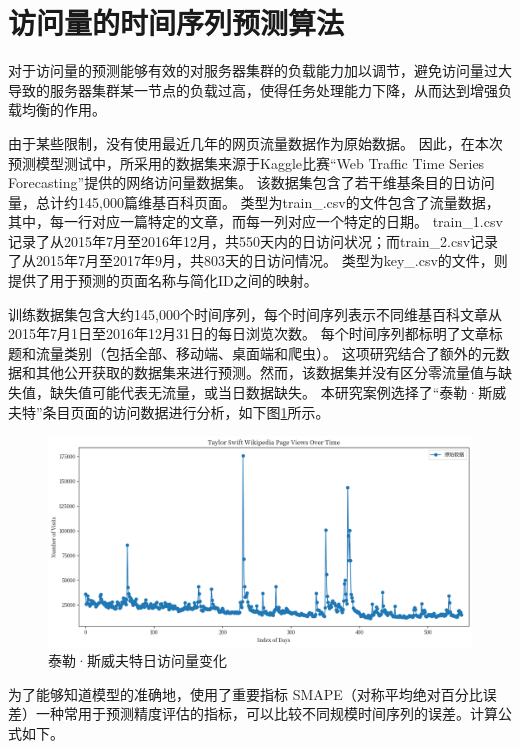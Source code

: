 \section{访问量的时间序列预测算法}

对于访问量的预测能够有效的对服务器集群的负载能力加以调节，避免访问量过大导致的服务器集群某一节点的负载过高，使得任务处理能力下降，从而达到增强负载均衡的作用。

由于某些限制，没有使用最近几年的网页流量数据作为原始数据。
因此，在本次预测模型测试中，所采用的数据集来源于Kaggle比赛“Web Traffic Time Series Forecasting”提供的网络访问量数据集。
该数据集包含了若干维基条目的日访问量，总计约145,000篇维基百科页面。
类型为train\_.csv的文件包含了流量数据，其中，每一行对应一篇特定的文章，而每一列对应一个特定的日期。
train\_1.csv记录了从2015年7月至2016年12月，共550天内的日访问状况；而train\_2.csv记录了从2015年7月至2017年9月，共803天的日访问情况。
类型为key\_.csv的文件，则提供了用于预测的页面名称与简化ID之间的映射。

训练数据集包含大约145,000个时间序列，每个时间序列表示不同维基百科文章从2015年7月1日至2016年12月31日的每日浏览次数。
每个时间序列都标明了文章标题和流量类别（包括全部、移动端、桌面端和爬虫）。
这项研究结合了额外的元数据和其他公开获取的数据集来进行预测。然而，该数据集并没有区分零流量值与缺失值，缺失值可能代表无流量，或当日数据缺失。
本研究案例选择了“泰勒·斯威夫特”条目页面的访问数据进行分析，如下图\ref{Taylor_swift}所示。

\begin{figure}[htb]
  \centering
  \includegraphics[width=\textwidth]{figures/taylor_source.png}
  \caption{泰勒·斯威夫特日访问量变化}
  \label{Taylor_swift}
\end{figure}

为了能够知道模型的准确地，使用了重要指标 SMAPE（对称平均绝对百分比误差）一种常用于预测精度评估的指标，可以比较不同规模时间序列的误差。计算公式如下。


